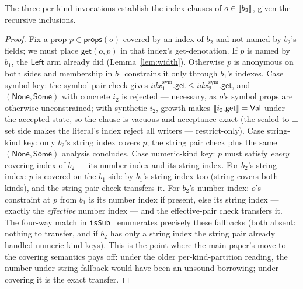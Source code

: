 \documentclass[11pt]{article}
\begin{document}
\begin{lemma}
\label{lem:indexes}
The three per-kind invocations establish the index clauses of
$o \in \llbracket b_2 \rrbracket$, given the recursive inclusions.
\end{lemma}
\begin{proof}
Fix a prop $p \in \mathsf{props}(o)$ covered by an index of $b_2$ and
not named by $b_2$'s fields; we must place $\mathsf{get}(o,p)$ in that
index's get-denotation. If $p$ is named by $b_1$, the $\mathsf{Left}$
arm already did (Lemma~\ref{lem:width}). Otherwise $p$ is anonymous on
both sides and membership in $b_1$ constrains it only through $b_1$'s
indexes. Case symbol key: the symbol pair check gives
$\mathit{idx}^{\mathrm{sym}}_1.\mathsf{get} \leq
\mathit{idx}^{\mathrm{sym}}_2.\mathsf{get}$, and
$(\mathsf{None},\mathsf{Some})$ with concrete $i_2$ is rejected ---
necessary, as $o$'s symbol props are otherwise unconstrained; with
synthetic $i_2$, growth makes $\llbracket i_2.\mathsf{get} \rrbracket = \mathsf{Val}$ under the
accepted state, so the clause is vacuous and acceptance exact (the
sealed-to-$\bot$ set side makes the literal's index reject all writers
--- restrict-only). Case string-kind key: only $b_2$'s string index
covers $p$; the string pair check plus the same
$(\mathsf{None},\mathsf{Some})$ analysis concludes. Case numeric-kind
key: $p$ must satisfy \emph{every} covering index of $b_2$ --- its
number index and its string index. For $b_2$'s string index: $p$ is
covered on the $b_1$ side by $b_1$'s string index too (string covers
both kinds), and the string pair check transfers it. For $b_2$'s number
index: $o$'s constraint at $p$ from $b_1$ is its number index if
present, else its string index --- exactly the \emph{effective} number
index --- and the effective-pair check transfers it. The four-way match
in \texttt{isSub\_} enumerates precisely these fallbacks (both absent:
nothing to transfer, and if $b_2$ has only a string index the string
pair already handled numeric-kind keys). This is the point where the
main paper's move to the covering semantics pays off: under the older
per-kind-partition reading, the number-under-string fallback would have
been an unsound borrowing; under covering it is the exact transfer.
\end{proof}
\end{document}
